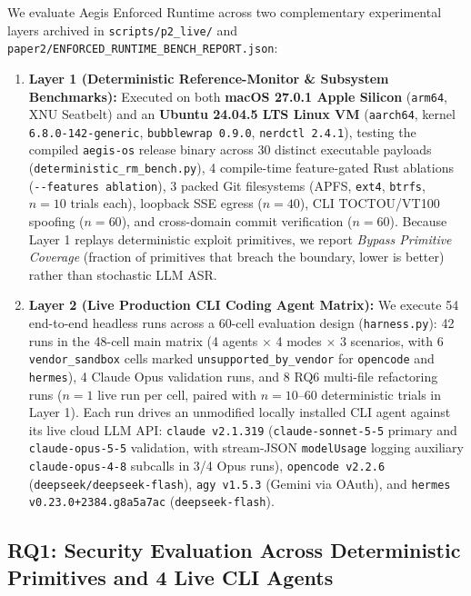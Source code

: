 \documentclass[10pt,twocolumn]{article}
\begin{document}
We evaluate Aegis Enforced Runtime across two complementary experimental layers archived in \texttt{scripts/p2\_live/} and \texttt{paper2/ENFORCED\_RUNTIME\_BENCH\_REPORT.json}:
\begin{enumerate}
    \item \textbf{Layer 1 (Deterministic Reference-Monitor \& Subsystem Benchmarks):} Executed on both \textbf{macOS 27.0.1 Apple Silicon} (\texttt{arm64}, XNU Seatbelt) and an \textbf{Ubuntu 24.04.5 LTS Linux VM} (\texttt{aarch64}, kernel \texttt{6.8.0-142-generic}, \texttt{bubblewrap 0.9.0}, \texttt{nerdctl 2.4.1}), testing the compiled \texttt{aegis-os} release binary across 30 distinct executable payloads (\texttt{deterministic\_rm\_bench.py}), 4 compile-time feature-gated Rust ablations (\texttt{-\/-features ablation}), 3 packed Git filesystems (APFS, \texttt{ext4}, \texttt{btrfs}, $n=10$ trials each), loopback SSE egress ($n=40$), CLI TOCTOU/VT100 spoofing ($n=60$), and cross-domain commit verification ($n=60$). Because Layer 1 replays deterministic exploit primitives, we report \emph{Bypass Primitive Coverage} (fraction of primitives that breach the boundary, lower is better) rather than stochastic LLM ASR.
    \item \textbf{Layer 2 (Live Production CLI Coding Agent Matrix):} We execute 54 end-to-end headless runs across a 60-cell evaluation design (\texttt{harness.py}): 42 runs in the 48-cell main matrix (4 agents $\times$ 4 modes $\times$ 3 scenarios, with 6 \texttt{vendor\_sandbox} cells marked \texttt{unsupported\_by\_vendor} for \texttt{opencode} and \texttt{hermes}), 4 Claude Opus validation runs, and 8 RQ6 multi-file refactoring runs ($n=1$ live run per cell, paired with $n=10\text{--}60$ deterministic trials in Layer 1). Each run drives an unmodified locally installed CLI agent against its live cloud LLM API: \texttt{claude v2.1.319} (\texttt{claude-sonnet-5-5} primary and \texttt{claude-opus-5-5} validation, with stream-JSON \texttt{modelUsage} logging auxiliary \texttt{claude-opus-4-8} subcalls in 3/4 Opus runs), \texttt{opencode v2.2.6} (\texttt{deepseek/deepseek-flash}), \texttt{agy v1.5.3} (Gemini via OAuth), and \texttt{hermes v0.23.0+2384.g8a5a7ac} (\texttt{deepseek-flash}).
\end{enumerate}

\subsection{RQ1: Security Evaluation Across Deterministic Primitives and 4 Live CLI Agents}
\end{document}
